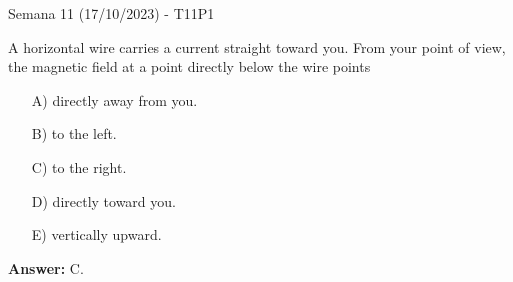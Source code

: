 \begin{frame}{Semana 11 (17/10/2023) - T11P1}
    
    A horizontal wire carries a current straight toward you. From your point of view, the magnetic field at a point directly below the wire points
    
    \begin{itemize}
        \item[A)] directly away from you.
        \item[B)] to the left.
        \item[C)] to the right.
        \item[D)] directly toward you.
        \item[E)] vertically upward.
    \end{itemize}
    
     \pause \centering \textbf{Answer:} C.
    
\end{frame}


